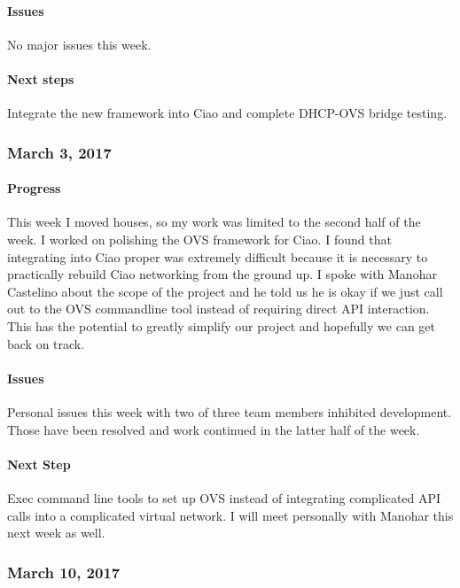 \documentclass[10pt,onecolumn,journal,draftclsnofoot]{IEEEtran}
\begin{document}
\paragraph{Issues} 

No major issues this week.

\paragraph{Next steps} 

Integrate the new framework into Ciao and complete DHCP-OVS bridge
testing.

\subsubsection{March 3, 2017} 

\paragraph{Progress} 

This week I moved houses, so my work was limited to the second half of
the week. I worked on polishing the OVS framework for Ciao. I found that
integrating into Ciao proper was extremely difficult because it is
necessary to practically rebuild Ciao networking from the ground up. I
spoke with Manohar Castelino about the scope of the project and he told
us he is okay if we just call out to the OVS commandline tool instead of
requiring direct API interaction. This has the potential to greatly
simplify our project and hopefully we can get back on track.

\paragraph{Issues} 

Personal issues this week with two of three team members inhibited
development. Those have been resolved and work continued in the latter
half of the week.

\paragraph{Next Step} 

Exec command line tools to set up OVS instead of integrating complicated
API calls into a complicated virtual network. I will meet personally
with Manohar this next week as well.

\subsubsection{March 10, 2017} 
\end{document}
